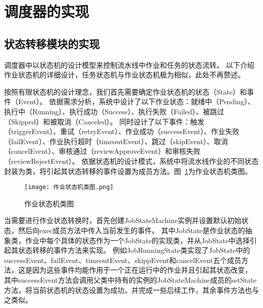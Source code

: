 \section{调度器的实现}

\subsection{状态转移模块的实现}

调度器中以状态机的设计模型来控制流水线中作业和任务的状态流转。
以下介绍作业状态机的详细设计，任务状态机与作业状态机极为相似，此处不再赘述。

按照有限状态机的设计理念，我们首先需要确定作业状态机的状态（State）和事件（Event）。
依据需求分析，系统中设计了以下作业状态：就绪中（Pending）、执行中（Running）、执行成功（Success）、执行失败（Failed）、被跳过（Skipped）和被取消（Canceled）。
同时设计了以下事件：触发（triggerEvent）、重试（retryEvent）、作业成功（successEvent）、作业失败（failEvent）、作业执行超时（timeoutEvent）、跳过（skipEvent）、取消（cancelEvent）、审核通过（reviewApproveEvent）和审核失败（reviewRejectEvent）。
依据状态机的设计模式，系统中将流水线作业的不同状态封装为类，将引起其状态转移的事件设置为成员方法。图~\ref{fig:作业状态机类图}为作业状态机类图。

\begin{figure}[h]
  \centering
  \texttt{[image: 作业状态机类图.png]}
  \caption{作业状态机类图}
  \label{fig:作业状态机类图}
\end{figure}

当需要进行作业状态转换时，首先创建JobStateMachine实例并设置默认初始状态，然后向exec成员方法中传入当前发生的事件。
其中JobState是作业状态的抽象类，作业中每个具体的状态作为一个JobState的实现类，并从JobState中选择引起其状态转移的事件方法来实现。
例如JobRunningState类实现了JobState中的successEvent、failEvent、timeoutEvent、skippEvent和cancelEvent五个成员方法，这是因为这些事件均能作用于一个正在运行中的作业并且引起其状态改变，
其中successEvent方法会调用父类中持有的实例的JobStateMachine成员的setState方法，将当前状态机的状态设置为成功，并完成一些后续工作，其余事件方法也与之类似。

